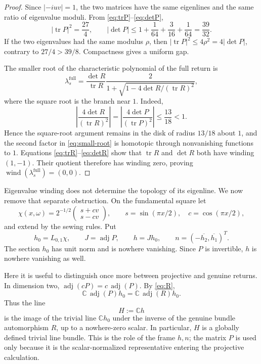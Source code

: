 \documentclass[11pt]{amsart}
\theoremstyle{remark}
\newcommand{\C}{\mathbb C}
\newcommand{\wind}{\operatorname{wind}}
\newcommand{\tr}{\operatorname{tr}}
\newcommand{\adj}{\operatorname{adj}}
\begin{document}
\begin{proof}
Since $|-iuv|=1$, the two matrices have the same eigenlines and the same ratio
of eigenvalue moduli.  From \eqref{eq:trP}--\eqref{eq:detP},
\[
 |\tr P|^2=\frac{27}{4},
 \qquad
 |\det P|\le1+\frac1{64}+\frac3{16}+\frac1{64}=\frac{39}{32}.
\]
If the two eigenvalues had the same modulus $\rho$, then
$|\tr P|^2\le4\rho^2=4|\det P|$, contrary to
$27/4>39/8$.  Compactness gives a uniform gap.

The smaller root of the characteristic polynomial of the full return is
\begin{equation}\label{eq:small-root}
 \lambda_s^{\mathrm{full}}
 =\frac{\det R}{\tr R}
   \frac{2}{1+\sqrt{1-4\det R/(\tr R)^2}},
\end{equation}
where the square root is the branch near $1$.  Indeed,
\[
 \left|\frac{4\det R}{(\tr R)^2}\right|
 =\left|\frac{4\det P}{(\tr P)^2}\right|
 \le\frac{13}{18}<1.
\]
Hence the square-root argument remains in the disk of radius $13/18$ about
$1$, and the second factor in \eqref{eq:small-root} is homotopic through
nonvanishing functions to $1$.  Equations \eqref{eq:trR}--\eqref{eq:detR}
show that $\tr R$ and $\det R$ both have winding $(1,-1)$.  Their quotient
therefore has winding zero, proving
$\wind(\lambda_s^{\mathrm{full}})=(0,0)$.
\end{proof}

Eigenvalue winding does not determine the topology of its eigenline.  We now
remove that separate obstruction.  On the fundamental square let
\begin{equation}\label{eq:chi}
 \chi(x,\omega)=2^{-1/2}
 \begin{pmatrix}s+cv\\s-cv\end{pmatrix},
 \qquad
 s=\sin(\pi x/2),\quad c=\cos(\pi x/2),
\end{equation}
and extend by the sewing rules.  Put
\begin{equation}\label{eq:hframe}
 h_0=L_{0,1}\chi,
 \qquad
 J=\adj P,
 \qquad
 h=Jh_0,
 \qquad
 n=(-\overline{h_2},\overline{h_1})^T.
\end{equation}
The section $h_0$ has unit norm and is nowhere vanishing.  Since $P$ is
invertible, $h$ is nowhere vanishing as well.

Here it is useful to distinguish once more between projective and genuine
returns.  In dimension two, $\adj(cP)=c\,\adj(P)$.  By \eqref{eq:R},
\begin{equation}\label{eq:genuine-H}
 \C\,\adj(P)h_0=\C\,\adj(R)h_0.
\end{equation}
Thus the line
\[
 H:=\C h
\]
is the image of the trivial line $\C h_0$ under the inverse of the genuine
bundle automorphism $R$, up to a nowhere-zero scalar.  In particular, $H$ is
a globally defined trivial line bundle.  This is the role of the frame
$h,n$; the matrix $P$ is used only because it is the scalar-normalized
representative entering the projective calculation.
\end{document}
